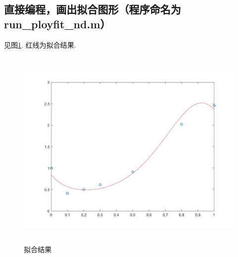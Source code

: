 \subsection{直接编程，画出拟合图形（程序命名为run\_ployfit\_nd.m）}
见图\ref{fig: 拟合}. 红线为拟合结果.
\begin{figure}
  \includegraphics[height=9.9cm]{../image/run_polyfit_nd.jpg}
  \caption{拟合结果}
  \label{fig: 拟合}
\end{figure}








